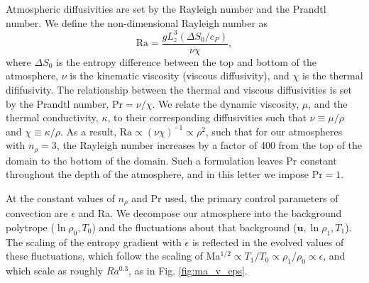 \documentclass[aps, prl, twocolumn, groupedaddress, amsfonts, amssymb, amsmath]{revtex4-1}
\begin{document}
Atmospheric diffusivities are set by the Rayleigh number and the Prandtl number.  We define the
non-dimensional Rayleigh number as
\begin{equation}
\text{Ra} = \frac{g L_z^3 (\Delta S_0 / c_P)}{\nu\chi},
\end{equation}
where $\Delta S_0$ is the entropy difference between the top and bottom of the atmosphere, 
$\nu$ is the kinematic viscosity (viscous diffusivity), and $\chi$ is the thermal dififusivity.  
The relationship between the thermal and viscous diffusivities is
set by the Prandtl number, Pr$ = \nu/\chi$.   We relate the dynamic viscosity, $\mu$, and the thermal conductivity,
$\kappa$, to their corresponding diffusivities such that 
$\nu \equiv \mu/\rho$ and $\chi \equiv \kappa/\rho$.  As a result, $\text{Ra} \propto (\nu\chi)^{-1} \propto
\rho^2$, such that for our atmospheres with $n_{\rho} = 3$, the Rayleigh number increases by a factor of
400 from the top of the domain to the bottom of the domain.  Such a formulation leaves Pr
constant throughout the depth of the atmosphere, and in this letter we impose $\text{Pr} = 1$.

At the constant values of $n_\rho$ and Pr used, the primary control parameters of convection are $\epsilon$
and Ra.  We decompose our atmosphere into the background polytrope ($\ln\rho_{0}, T_{0}$) and the fluctuations
about that background ($\bm{u}, \ln\rho_{1}, T_{1}$).  The scaling of the entropy gradient with $\epsilon$
is reflected in the evolved values of these fluctuations, which follow the scaling of
Ma$^{1/2} \propto T_1/T_0 \propto \rho_{1}/\rho_{0} \propto \epsilon$, and which scale as roughly $Ra^{0.3}$,
as in Fig. \ref{fig:ma_v_eps}.
\end{document}
